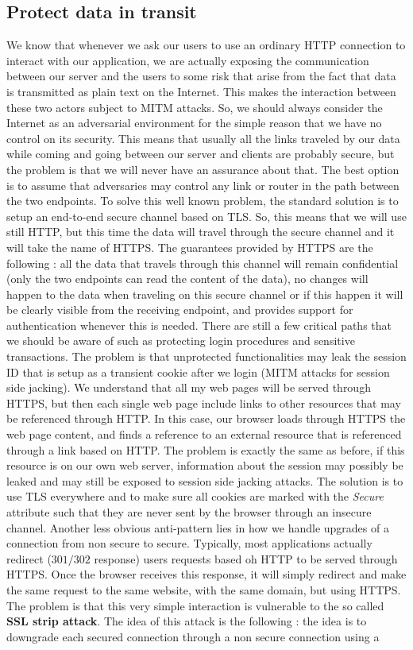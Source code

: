 \subsection{Protect data in transit}
We know that whenever we ask our users to use an ordinary HTTP connection to interact with our application, we are actually exposing the communication between our server and the users to some risk that arise from the fact that data is transmitted as plain text on the Internet. This makes the interaction between these two actors subject to MITM attacks. So, we should always consider the Internet as an adversarial environment for the simple reason that we have no control on its security. This means that usually all the links traveled by our data while coming and going between our server and clients are probably secure, but the problem is that we will never have an assurance about that. The  best option is to assume that adversaries may control any link or router in the path between the two endpoints. To solve this well known problem, the standard solution is to setup an end-to-end secure channel based on TLS. So, this means that we will use still HTTP, but this time the data will travel through the secure channel and it will take the name of HTTPS. The guarantees provided by HTTPS are the following : all the data that travels through this channel will remain confidential (only the two endpoints can read the content of the data), no changes will happen to the data when traveling on this secure channel or if this happen it will be clearly visible from the receiving endpoint, and provides support for authentication whenever this is needed. There are still a few critical paths that we should be aware of such as protecting login procedures and sensitive transactions. The problem is that unprotected functionalities may leak the session ID that is setup as a transient cookie after we login (MITM attacks for session side jacking). We understand that all my web pages will be served through HTTPS, but then each single web page include links to other resources that may be referenced through HTTP. In this case, our browser loads through HTTPS the web page content, and finds a reference to an external resource that is referenced through a link based on HTTP. The problem is exactly the same as before, if this resource is on our own web server, information about the session may possibly be leaked and may still be exposed to session side jacking attacks. The solution is to use TLS everywhere and to make sure all cookies are marked with the \textit{Secure} attribute such that they are never sent by the browser through an insecure channel. Another less obvious anti-pattern lies in how we handle upgrades of a connection from non secure to secure. Typically, most applications actually redirect ($301/302$ response) users requests based oh HTTP to be served through HTTPS. Once the browser receives this response, it will simply redirect and make the same request to the same website, with the same domain, but using HTTPS. The problem is that this very simple interaction is vulnerable to the so called \textbf{SSL strip attack}. The idea of this attack is the following : the idea is to downgrade each secured connection through a non secure connection using a 